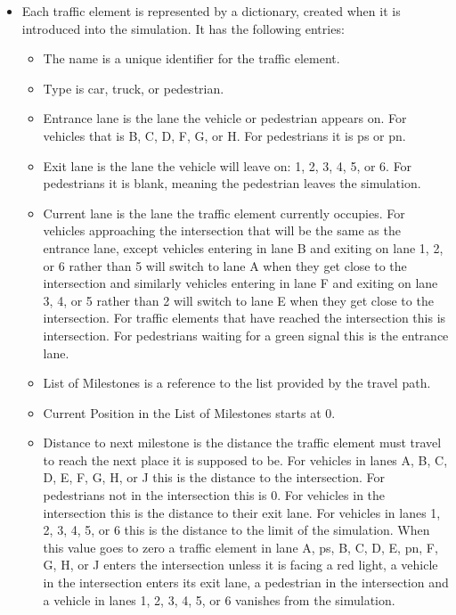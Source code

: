 \documentclass[letterpaper,twoside]{article}
\begin{document}
\begin{itemize}
\item{Each traffic element is represented by a dictionary, created when it is
introduced into the simulation.  It has the following entries:}

\begin{itemize}

\item{The name is a unique identifier for the traffic element.}
\item{Type is car, truck, or pedestrian.}
\item{Entrance lane is the lane the vehicle or pedestrian
  appears on.  For vehicles that is B, C, D, F, G, or H.  For pedestrians
  it is ps or pn.}
\item{Exit lane is the lane the vehicle will leave on: 1, 2, 3, 4, 5, or 6.
  For pedestrians it is blank, meaning the pedestrian leaves the simulation.}
\item{Current lane is the lane the traffic element currently occupies.
  For vehicles
  approaching the intersection that will be the same as the entrance lane,
  except vehicles entering in lane B and exiting on lane 1, 2, or 6 rather
  than 5 will switch to lane A when they get close to the intersection
  and similarly vehicles entering in lane F and exiting on lane 3, 4, or 5
  rather than 2 will switch to lane E when they get close to the
  intersection.  For traffic elements that have reached the intersection this
  is intersection.  For pedestrians waiting for a green signal
  this is the entrance lane.}
\item{List of Milestones is a reference to the list provided by
  the travel path.}
\item{Current Position in the List of Milestones starts at 0.}
\item{Distance to next milestone is the distance the traffic element
  must travel
  to reach the next place it is supposed to be.  For vehicles in lanes
  A, B, C, D, E, F, G, H, or J this is the distance to the intersection.
  For pedestrians not in the intersection this is 0.
  For vehicles in the intersection this is the distance to their exit
  lane.  For vehicles in lanes 1, 2, 3, 4, 5, or 6 this is the distance
  to the limit of the simulation.
  When this value goes to zero a traffic element
  in lane A, ps, B, C, D, E, pn, F, G, H, or J enters the intersection
  unless it is facing a red light,
  a vehicle
  in the intersection enters its exit lane, a pedestrian in the intersection
  and a vehicle in lanes 1, 2, 3, 4, 5, or 6 vanishes from the simulation.
}
\end{itemize}
\end{itemize}
\end{document}

